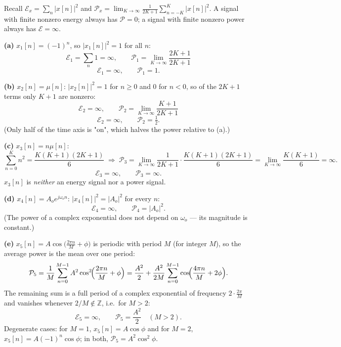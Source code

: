 
Recall $\mathcal{E}_x=\sum_n|x[n]|^{2}$ and
$\mathcal{P}_x=\lim_{K\to\infty}\frac{1}{2K+1}\sum_{n=-K}^{K}|x[n]|^{2}$. A signal with finite
nonzero energy always has $\mathcal{P}=0$; a signal with finite nonzero power always has
$\mathcal{E}=\infty$.

\textbf{(a)} $x_1[n]=(-1)^{n}$, so $|x_1[n]|^{2}=1$ for all $n$:
\[
\mathcal{E}_1=\sum_{n}1=\infty,\qquad
\mathcal{P}_1=\lim_{K\to\infty}\frac{2K+1}{2K+1}
\]
\[
\boxed{\;\mathcal{E}_1=\infty,\qquad \mathcal{P}_1=1 .\;}
\]

\textbf{(b)} $x_2[n]=\mu[n]$: $|x_2[n]|^{2}=1$ for $n\ge0$ and $0$ for $n<0$, so of the
$2K+1$ terms only $K+1$ are nonzero:
\[
\mathcal{E}_2=\infty,\qquad
\mathcal{P}_2=\lim_{K\to\infty}\frac{K+1}{2K+1}
\]
\[
\boxed{\;\mathcal{E}_2=\infty,\qquad \mathcal{P}_2=\tfrac12 .\;}
\]
(Only half of the time axis is "on", which halves the power relative to (a).)

\textbf{(c)} $x_3[n]=n\mu[n]$:
\[
\sum_{n=0}^{K}n^{2}=\frac{K(K+1)(2K+1)}{6}
\;\Longrightarrow\;
\mathcal{P}_3=\lim_{K\to\infty}\frac{1}{2K+1}\cdot\frac{K(K+1)(2K+1)}{6}
=\lim_{K\to\infty}\frac{K(K+1)}{6}=\infty .
\]
\[
\boxed{\;\mathcal{E}_3=\infty,\qquad \mathcal{P}_3=\infty .\;}
\]
$x_3[n]$ is \emph{neither} an energy signal nor a power signal.

\textbf{(d)} $x_4[n]=A_o e^{j\omega_o n}$: $|x_4[n]|^{2}=|A_o|^{2}$ for every $n$:
\[
\boxed{\;\mathcal{E}_4=\infty,\qquad \mathcal{P}_4=|A_o|^{2} .\;}
\]
(The power of a complex exponential does not depend on $\omega_o$ --- its magnitude is
constant.)

\textbf{(e)} $x_5[n]=A\cos\bigl(\tfrac{2\pi n}{M}+\phi\bigr)$ is periodic with period $M$
(for integer $M$), so the average power is the mean over one period:
\[
\mathcal{P}_5=\frac{1}{M}\sum_{n=0}^{M-1}A^{2}\cos^{2}\!\Bigl(\frac{2\pi n}{M}+\phi\Bigr)
=\frac{A^{2}}{2}+\frac{A^{2}}{2M}\sum_{n=0}^{M-1}\cos\!\Bigl(\frac{4\pi n}{M}+2\phi\Bigr).
\]
The remaining sum is a full period of a complex exponential of frequency $2\cdot\frac{2\pi}{M}$
and vanishes whenever $2/M\notin\mathbb{Z}$, i.e.\ for $M>2$:
\[
\boxed{\;\mathcal{E}_5=\infty,\qquad \mathcal{P}_5=\frac{A^{2}}{2}\quad (M>2).\;}
\]
Degenerate cases: for $M=1$, $x_5[n]=A\cos\phi$ and for $M=2$, $x_5[n]=A(-1)^{n}\cos\phi$;
in both, $\mathcal{P}_5=A^{2}\cos^{2}\phi$.

